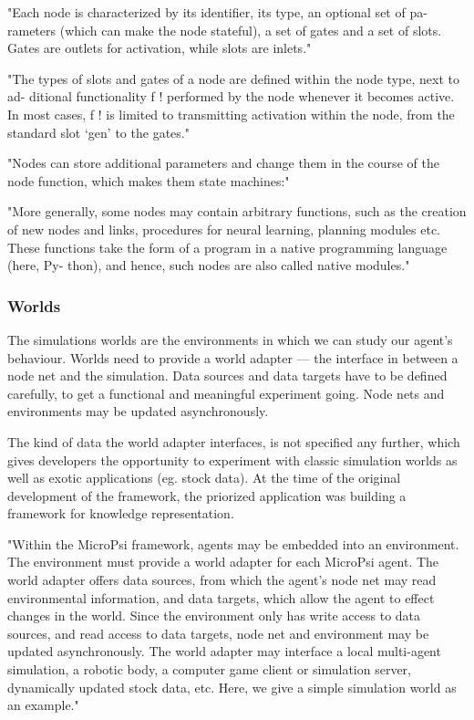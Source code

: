 "Each node is characterized by its identifier, its type, an optional set of pa- rameters (which can make the node stateful), a set of gates and a set of slots. Gates are outlets for activation, while slots are inlets."

"The types of slots and gates of a node are defined within the node type, next to ad- ditional functionality f ! performed by the node whenever it becomes active. In most cases, f ! is limited to transmitting activation within the node, from the standard slot ‘gen’ to the gates."

"Nodes can store additional parameters and change them in the course of the node function, which makes them state machines:"

"More generally, some nodes may contain arbitrary functions, such as the creation of new nodes and links, procedures for neural learning, planning modules etc. These functions take the form of a program in a native programming language (here, Py- thon), and hence, such nodes are also called native modules."



        \subsubsection{Worlds}
The simulations worlds are the environments in which we can study our agent's behaviour. Worlds need to provide a world adapter --- the interface in between a node net and the simulation. Data sources and data targets have to be defined carefully, to get a functional and meaningful experiment going. Node nets and environments may be updated asynchronously.~\cite{conf/agi/Bach12}

The kind of data the world adapter interfaces, is not specified any further, which gives developers the opportunity to experiment with classic simulation worlds as well as exotic applications (eg. stock data). At the time of the original development of the framework, the priorized application was building a framework for knowledge representation.~\cite{conf/agi/Bach12}

"Within the MicroPsi framework, agents may be embedded into an environment. The environment must provide a world adapter for each MicroPsi agent. The world adapter offers data sources, from which the agent’s node net may read environmental information, and data targets, which allow the agent to effect changes in the world. Since the environment only has write access to data sources, and read access to data targets, node net and environment may be updated asynchronously.
The world adapter may interface a local multi-agent simulation, a robotic body, a computer game client or simulation server, dynamically updated stock data, etc. Here, we give a simple simulation world as an example."

